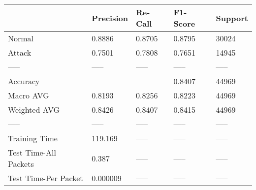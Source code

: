 \begin{tabular}{lllll}
\toprule
{} & Precision & Re-Call & F1-Score & Support \\
\midrule
Normal                &    0.8886 &  0.8705 &   0.8795 &   30024 \\
Attack                &    0.7501 &  0.7808 &   0.7651 &   14945 \\
-----                 &     ----- &   ----- &    ----- &   ----- \\
Accuracy              &           &         &   0.8407 &   44969 \\
Macro AVG             &    0.8193 &  0.8256 &   0.8223 &   44969 \\
Weighted AVG          &    0.8426 &  0.8407 &   0.8415 &   44969 \\
-----                 &     ----- &   ----- &    ----- &   ----- \\
Training Time         &   119.169 &   ----- &    ----- &   ----- \\
Test Time-All Packets &     0.387 &   ----- &    ----- &   ----- \\
Test Time-Per Packet  &  0.000009 &   ----- &    ----- &   ----- \\
\bottomrule
\end{tabular}
